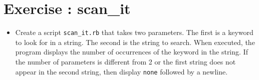 \documentclass{42-en}
\begin{document}



\chapter{Exercise \exercicenumber: scan\_it}

\exnumber{\exercicenumber}

\makeheaderfiles

\begin{itemize}

\item Create a script \texttt{scan\_it.rb} that takes two parameters. The first is a keyword to look for in a string. The second is the string to search. When executed, the program displays the number of occurrences of the keyword in the string. If the number of parameters is different from 2 or the first string does not appear in the second string, then display \texttt{none} followed by a newline. 


\end{itemize}



\end{document}
